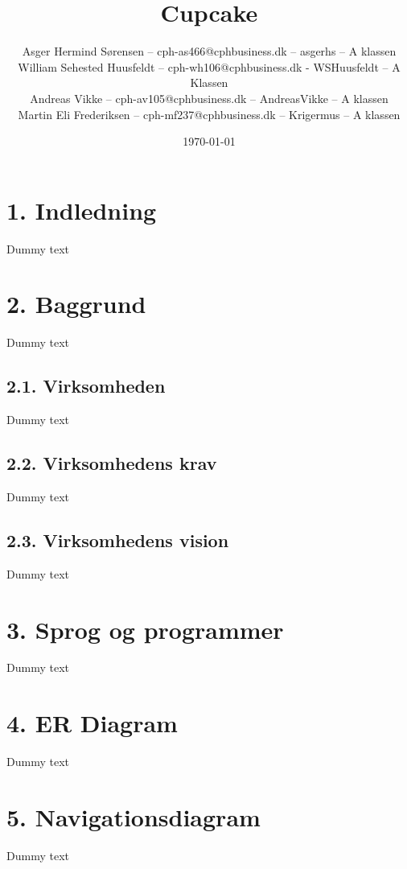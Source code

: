 \documentclass[11pt]{report}
\title{Cupcake}
\author{
Asger Hermind Sørensen – cph-as466@cphbusiness.dk – asgerhs –
  A klassen\\ William Sehested Huusfeldt – cph-wh106@cphbusiness.dk -
  WSHuusfeldt – A Klassen\\ Andreas Vikke – cph-av105@cphbusiness.dk –
  AndreasVikke – A klassen\\ Martin Eli Frederiksen –
  cph-mf237@cphbusiness.dk – Krigermus – A klassen}
\date{\today}
\begin{document}
\maketitle

\renewcommand{\cftchapleader}{\cftdotfill{\cftdotsep}}
\tableofcontents
\newpage

\chapter*{1. Indledning}
Dummy text

\newpage

\chapter*{2. Baggrund}
Dummy text
\section*{2.1. Virksomheden}
Dummy text
\section*{2.2. Virksomhedens krav}
Dummy text
\section*{2.3. Virksomhedens vision}
Dummy text

\newpage

\chapter*{3. Sprog og programmer}
Dummy text

\newpage

\chapter*{4. ER Diagram}
Dummy text

\newpage

\chapter*{5. Navigationsdiagram}
Dummy text
\end{document}
